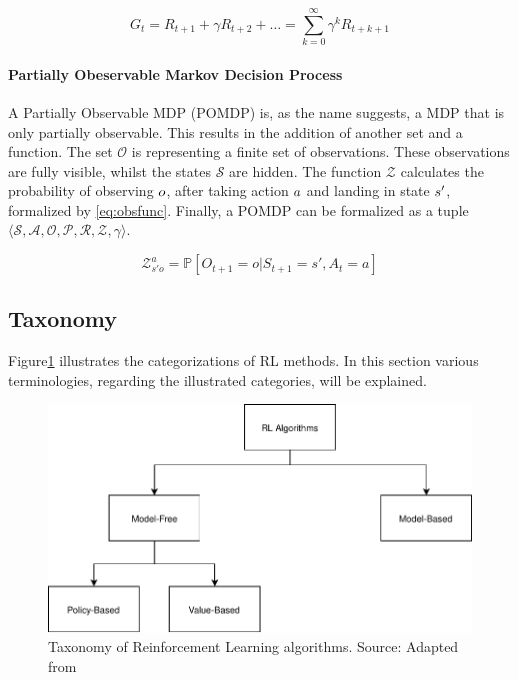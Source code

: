 \begin{equation}
G_{t} = R_{t+1} + \gamma R_{t+2} + \dots =   \displaystyle\sum_{k=0}^{\infty} \gamma ^{k}R_{t+k+1}
\label{eq:discounted_reward}
\end{equation}



\paragraph{Partially Obeservable Markov Decision Process}
A Partially Observable MDP (POMDP) is, as the name suggests, a MDP that is only partially observable. This results in the addition of another set and a function. The set \(\mathcal{O}\) is representing a finite set of observations. These observations are fully visible, whilst the states \(\mathcal{S}\) are hidden. The function \(\mathcal{Z}\) calculates the probability of observing $\mathnormal{o}$, after taking action $\mathnormal{a}$ and landing in state $\mathnormal{s'}$, formalized by \ref{eq:obsfunc}. Finally, a POMDP can be formalized as a tuple \(\langle \mathcal{S, A, O, P, R, Z, } \gamma \rangle\).

\begin{equation}
\mathcal{Z}_{s'o}^{a} = \mathbb{P}[O_{t+1} = o | S_{t+1} = s', A_{t} = a] 
\label{eq:obsfunc}
\end{equation}


\subsection{Taxonomy}
Figure\ref{fig:rl_taxonomy} illustrates the categorizations of RL methods. In this section various terminologies, regarding the illustrated categories, will be explained. 


\begin{figure}[H]
  \centering
  \includegraphics{images/rl_taxonomy}
  \caption[RL-Taxonomy]{Taxonomy of Reinforcement Learning algorithms. Source: Adapted from \cite{9418283}}
  \label{fig:rl_taxonomy}
\end{figure}  




